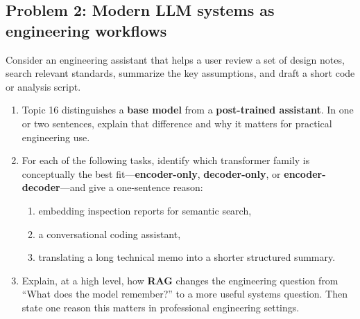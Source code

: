 \documentclass[12pt]{article}
\begin{document}
\newpage

\subsection*{Problem 2: Modern LLM systems as engineering workflows}
Consider an engineering assistant that helps a user review a set of design notes, search relevant standards, summarize the key assumptions, and draft a short code or analysis script.

\begin{enumerate}
    \renewcommand{\labelenumi}{(\alph{enumi})}
    \item Topic 16 distinguishes a \textbf{base model} from a \textbf{post-trained assistant}. In one or two sentences, explain that difference and why it matters for practical engineering use.

    \vspace{18pt}
    \fullunderline

    \vspace{18pt}
    \fullunderline

    \item For each of the following tasks, identify which transformer family is conceptually the best fit---\textbf{encoder-only}, \textbf{decoder-only}, or \textbf{encoder-decoder}---and give a one-sentence reason:
    \begin{enumerate}
        \renewcommand{\labelenumii}{(\roman{enumii})}
        \item embedding inspection reports for semantic search,
        \item a conversational coding assistant,
        \item translating a long technical memo into a shorter structured summary.
    \end{enumerate}

    \vspace{18pt}
    \fullunderline

    \vspace{18pt}
    \fullunderline

    \item Explain, at a high level, how \textbf{RAG} changes the engineering question from ``What does the model remember?'' to a more useful systems question. Then state one reason this matters in professional engineering settings.

    \vspace{18pt}
    \fullunderline

    \vspace{18pt}
    \fullunderline


\end{enumerate}
\end{document}
